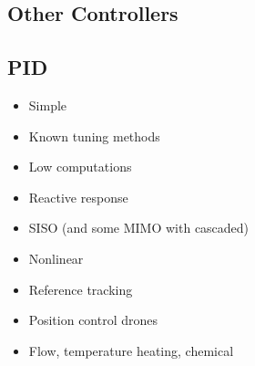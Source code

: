 \begin{mdframed}[backgroundcolor=red!20, frametitlerulewidth=0pt, innertopmargin=-2mm, innerbottommargin=2mm, skipabove=0mm]

\section{Other Controllers}
\end{mdframed}

\subsection{PID}
\begin{minipage}{0.33\textwidth}
    \begin{tcolorbox}[colframe=green!50!black, colback=green!5!white, title=Pros, left=0.5mm, right=0.5mm]
    \begin{itemize}[leftmargin=*]
        \item Simple
        \item Known tuning methods
        \item Low computations
    \end{itemize}
    \end{tcolorbox}
\end{minipage}
\begin{minipage}{0.33\textwidth}
    \begin{tcolorbox}[colframe=red!50!black, colback=red!5!white, title=Cons, left=0.5mm, right=0.5mm]
    \begin{itemize}[leftmargin=*]
        \item Reactive response
        \item SISO (and some MIMO with cascaded)
        \item Nonlinear
    \end{itemize}
    \end{tcolorbox}
\end{minipage}
\begin{minipage}{0.33\textwidth}
    \begin{tcolorbox}[colframe=gray!50!black, colback=gray!5!white, title=Examples, left=0.5mm, right=0.5mm]
    \begin{itemize}[leftmargin=*]
        \item Reference tracking
        \item Position control drones
        \item Flow, temperature heating, chemical
    \end{itemize}
    \end{tcolorbox}
\end{minipage}

